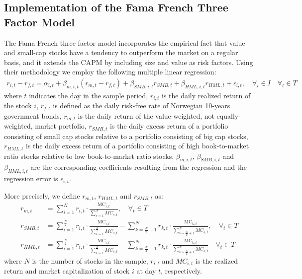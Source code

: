\subsection{Implementation of the Fama French Three Factor Model} The Fama French three factor model \cite{famafrench} incorporates the empirical fact that value and small-cap stocks have a tendency to outperform the market on a regular basis, and it extends the CAPM by including size and value as risk factors. Using their methodology we employ the following multiple linear regression:
\begin{align} 
    r_{i,t} - r_{f,t}= \alpha_{i,t} + \beta_{m,i,t}(r_{m,t} - r_{f,t}) + \beta_{SMB,i,t}r_{SMB,t} + \beta_{HML,i,t}r_{HML,t} + \epsilon_{i,t}, \quad  \forall_i \in I \quad  \forall_t \in T 
    \label{FFregression}
\end{align}
where $t$ indicates the day in the sample period, $r_{i,t}$ is the daily realized return of the stock $i$, $r_{f,t}$ is defined as the daily risk-free rate of Norwegian 10-years government bonds, $r_{m,t}$ is the daily return of the value-weighted, not equally-weighted, market portfolio, $r_{SMB,t}$ is the daily excess return of a portfolio consisting of small cap stocks relative to a portfolio consisting of big cap stocks, $r_{HML,t}$ is the daily excess return of a portfolio consisting of high book-to-market ratio stocks relative to low book-to-market ratio stocks. $\beta_{m,i,t}$, $\beta_{SMB,i,t}$ and $\beta_{HML,i,t}$ are the corresponding coefficients resulting from the regression and the regression error is $\epsilon_{i,t}$.

More precisely, we define $r_{m,t}$, $r_{HML,t}$ and $r_{SMB,t}$ as:
\begin{align}
    r_{m,t} &= \sum_{i=1}^{N} r_{i,t} \cdot \frac{\text{MC}_{i,t}}{\sum_{s=1}^{N} MC_{s,t}},  \quad  \forall_t \in T \\
    r_{SMB,t} &= \sum_{i=1}^{\frac{N}{2}} r_{i,t} \cdot \frac{\text{MC}_{i,t}}{\sum_{s=1}^{\frac{N}{2}} MC_{s,t}} - \sum_{k=\frac{N}{2}+1}^{N} r_{k,t} \cdot \frac{\text{MC}_{k,t}}{\sum_{s={\frac{N}{2}+1}}^{N} MC_{s,t}}, \quad  \forall_t \in T \\
    r_{HML,t} &= \sum_{i=1}^{\frac{N}{2}} r_{i,t} \cdot \frac{\text{MC}_{i,t}}{\sum_{s=1}^{\frac{N}{2}} MC_{s,t}} - \sum_{k=\frac{N}{2}+1}^{N} r_{k,t} \cdot \frac{\text{MC}_{k,t}}{\sum_{s=\frac{N}{2}+1}^{N} MC_{s,t}} \quad  \forall_t \in T
\end{align}
where $N$ is the number of stocks in the sample, $r_{i,t}$ and $MC_{i,t}$ is the realized return and market capitalization of stock $i$ at day $t$, respectively. 

